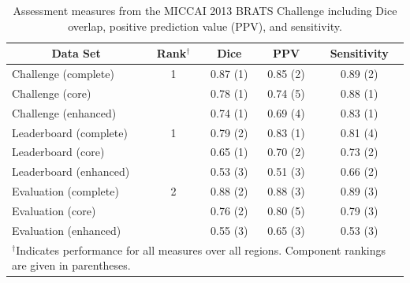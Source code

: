 \documentclass[preprint,authoryear,review,12pt]{elsarticle}
\begin{document}


\begin{table}
\caption{Assessment measures from the MICCAI 2013 BRATS Challenge including
 Dice overlap, positive prediction value (PPV), and sensitivity.}
\label{table:results}
\begin{center}
\begin{tabular*}{0.99\textwidth}{@{\extracolsep{\fill} } l c c c c}
\toprule
\multicolumn{1}{c}{ \bf Data Set} & {\bf Rank}$^\dagger$ & {\bf Dice} & {\bf PPV} & {\bf Sensitivity} \\
\midrule
Challenge (complete) & 1 & 0.87 (1) & 0.85 (2) & 0.89 (2) \\
Challenge (core) & {} & 0.78 (1) & 0.74 (5) & 0.88 (1) \\
Challenge (enhanced) & {} & 0.74 (1) & 0.69 (4) & 0.83 (1) \\
\midrule
Leaderboard (complete) &  1 & 0.79 (2) & 0.83 (1) & 0.81 (4) \\
Leaderboard (core)     & {} & 0.65 (1) & 0.70 (2) & 0.73 (2) \\
Leaderboard (enhanced) & {} & 0.53 (3) & 0.51 (3) & 0.66 (2) \\
\midrule
Evaluation (complete) &  2 & 0.88 (2) & 0.88 (3) & 0.89 (3) \\
Evaluation (core)     & {} & 0.76 (2) & 0.80 (5) & 0.79 (3) \\
Evaluation (enhanced) & {} & 0.55 (3) & 0.65 (3) & 0.53 (3) \\
\bottomrule
\multicolumn{5}{l}{\scriptsize$^\dagger$Indicates performance
for all measures over all regions.  Component rankings are 
given in parentheses.
}
\end{tabular*}
\end{center}
\end{table}
\end{document}
